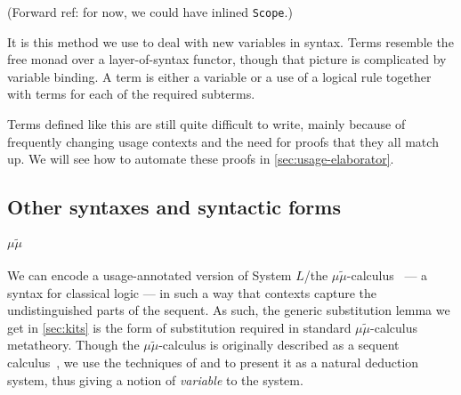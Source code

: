 
{\color{red}(Forward ref: for now, we could have inlined \texttt{Scope}.)}

It is this method we use to deal with new variables in syntax.
Terms resemble the free monad over a layer-of-syntax functor, though that
picture is complicated by variable binding.
A term is either a variable or a use of a logical rule together with terms
for each of the required subterms.


Terms defined like this are still quite difficult to write, mainly because of
frequently changing usage contexts and the need for proofs that they all match
up.
We will see how to automate these proofs in \cref{sec:usage-elaborator}.







\subsection{Other syntaxes and syntactic forms}

\paragraph{$\mu\tilde\mu$}
We can encode a usage-annotated version of System $L$/the
$\mu\tilde\mu$-calculus~\cite{CH00} --- a syntax for classical logic --- in
such a way that contexts capture the undistinguished parts of the sequent.
As such, the generic substitution lemma we get in \cref{sec:kits} is the form
of substitution required in standard $\mu\tilde\mu$-calculus metatheory.
Though the $\mu\tilde\mu$-calculus is originally described as a sequent
calculus~\cite{CH00}, we use the techniques of
\citet[p.~12]{herbelin-hab} and \citet{LC06} to present it as a natural
deduction system, thus giving a notion of \emph{variable} to the system.

